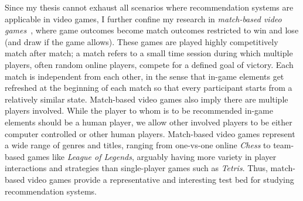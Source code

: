 
Since my thesis cannot exhaust all scenarios where recommendation systems are applicable in video games, I further confine my research in \textit{match-based video games}~\cite{guo2012analysis}, where game outcomes become match outcomes restricted to win and lose (and draw if the game allows). These games are played highly competitively match after match; a match refers to a small time session during which multiple players, often random online players, compete for a defined goal of victory. Each match is independent from each other, in the sense that in-game elements get refreshed at the beginning of each match so that every participant starts from a relatively similar state. Match-based video games also imply there are multiple players involved. While the player to whom is to be recommended in-game elements should be a human player, we allow other involved players to be either computer controlled or other human players. Match-based video games represent a wide range of genres and titles, ranging from one-vs-one online \textit{Chess} to team-based games like \textit{League of Legends}, arguably having more variety in player interactions and strategies than single-player games such as \textit{Tetris}. Thus, match-based video games provide a representative and interesting test bed for studying recommendation systems.





